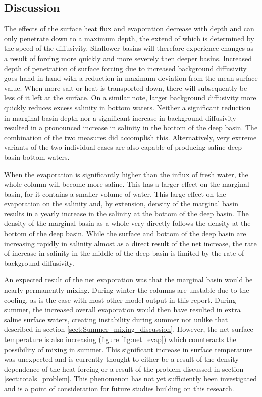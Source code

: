 \documentclass[twocolumn]{article}
\begin{document}
\subsection{Discussion}
The effects of the surface heat flux and evaporation decrease with depth and can only penetrate down to a maximum depth, the extend of which is determined by the speed of the diffusivity. Shallower basins will therefore experience changes as a result of forcing more quickly and more severely then deeper basins. Increased depth of penetration of surface forcing due to increased background diffusivity goes hand in hand with a reduction in maximum deviation from the mean surface value. When more salt or heat is transported down, there will subsequently be less of it left at the surface. On a similar note, larger background diffusivity more quickly reduces excess salinity in bottom waters.
Neither a significant reduction in marginal basin depth nor a significant increase in background diffusivity resulted in a pronounced increase in salinity in the bottom of the deep basin. The combination of the two measures did accomplish this. Alternatively, very extreme variants of the two individual cases are also capable of producing saline deep basin bottom waters.

When the evaporation is significantly higher than the influx of fresh water, the whole column will become more saline. This has a larger effect on the marginal basin, for it contains a smaller volume of water. This large effect on the evaporation on the salinity and, by extension, density of the marginal basin results in a yearly increase in the salinity at the bottom of the deep basin. The density of the marginal basin as a whole very directly follows the density at the bottom of the deep basin. While the surface and bottom of the deep basin are increasing rapidly in salinity almost as a direct result of the net increase, the rate of increase in salinity in the middle of the deep basin is limited by the rate of background diffusivity.

An expected result of the net evaporation was that the marginal basin would be nearly permanently mixing. During winter the columns are unstable due to the cooling, as is the case with most other model output in this report. During summer, the increased overall evaporation would then have resulted in extra saline surface waters, creating instability during summer not unlike that described in section \ref{sect:Summer_mixing_discussion}. However, the net surface temperature is also increasing (figure \ref{fig:net_evap}) which counteracts the possibility of mixing in summer. This significant increase in surface temperature was unexpected and is currently thought to either be a result of the density dependence of the heat forcing or a result of the problem discussed in section \ref{sect:totals_problem}. This phenomenon has not yet sufficiently been investigated and is a point of consideration for future studies building on this research.
\end{document}
